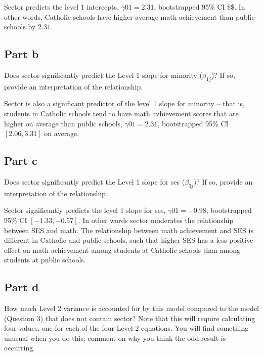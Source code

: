 \documentclass[]{article}
\begin{document}
Sector predicts the level 1 intercepts, \(\gamma01 = 2.31\),
bootstrapped 95\% CI \$\$. In other words, Catholic schools have higher
average math achievement than public schools by \(2.31\).

\subsection{Part b}\label{part-b-2}

Does sector significantly predict the Level 1 slope for minority
(\(\beta_{1j}\))? If so, provide an interpretation of the relationship.

Sector is also a significant predictor of the level 1 slope for minority
-- that is, students in Catholic schools tend to have math avhievement
scores that are higher on average than public schools,
\(\gamma01 = 2.31\), bootstrapped 95\% CI \([2.06, 3.31]\) on average.

\subsection{Part c}\label{part-c-2}

Does sector significantly predict the Level 1 slope for ses
(\(\beta_{3j}\))? If so, provide an interpretation of the relationship.

Sector significantly predicts the level 1 slope for ses,
\(\gamma01 = -0.98\), bootstrapped 95\% CI \([-1.33, -0.57]\). In other
words sector moderates the relationship between SES and math. The
relationship between math achievement and SES is different in Catholic
and public schools, such that higher SES has a less positive effect on
math achievement among students at Catholic schools than among students
at public schools.

\subsection{Part d}\label{part-d-2}

How much Level 2 variance is accounted for by this model compared to the
model (Question 3) that does not contain sector? Note that this will
require calculating four values, one for each of the four Level 2
equations. You will find something unusual when you do this; comment on
why you think the odd result is occurring.
\end{document}
